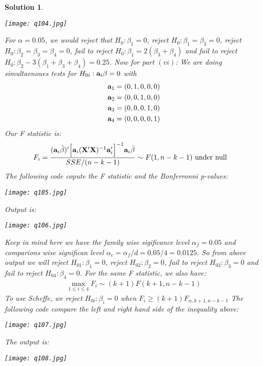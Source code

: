 \documentclass[11pt]{article}
\newtheorem{sol}{Solution}
\begin{document}
\begin{sol}
	\begin{center}
		\texttt{[image: q104.jpg]}
	\end{center}	
	For $\alpha = 0.05$, we would reject that $H_0: \beta_1 = 0$, reject $H_0: \beta_1 = \beta_3 = 0$, reject $H_0: \beta_2 = \beta_3 = \beta_4 = 0$, fail to reject $H_0: \beta_1 = 2(\beta_3 + \beta_4)$ and fail to reject $H_0: \beta_2 - 3(\beta_1 + \beta_3 + \beta_4) = 0.25$.\vskip 2mm
	Now for part $(vi)$:\vskip 2mm
	We are doing simultaenoues tests for $H_{0i}: {\bf a}_i \beta = 0$ with
	\begin{align*}
		{\bf a}_1 &= (0, 1, 0, 0, 0)\\
		{\bf a}_2 &= (0, 0, 1, 0, 0)\\
		{\bf a}_3 &= (0, 0, 0, 1, 0)\\
		{\bf a}_4 &= (0, 0, 0, 0, 1)
	\end{align*} 
	Our F statistic is:
	\begin{align*}
		F_i &= \frac{({\bf a}_i\hat{\beta})'\Big[{\bf a}_i({\bf X}'{\bf X})^{-1}{\bf a}_i'\Big]^{-1}{\bf a}_i\hat{\beta}}{SSE/(n - k - 1)} \sim F(1, n - k - 1) \text{ under null}
	\end{align*}
	The following code copute the F statistic and the Bonferronni p-values:
	\begin{center}
		\texttt{[image: q105.jpg]}
	\end{center}	
	Output is:
	\begin{center}
		\texttt{[image: q106.jpg]}
	\end{center}	
	Keep in mind here we have the family wise sigificance level $\alpha_f = 0.05$ and comparions wise significan level $\alpha_c = \alpha_f/d = 0.05/4 = 0.0125$.\vskip 2mm
	So from above output we will reject $H_{01}: \beta_1 =0$, reject $H_{02}: \beta_2 = 0$, fail to reject $H_{03}: \beta_3 = 0 $ and fail to reject $H_{04}: \beta_4 = 0$.\vskip 2mm
	For the same F statistic, we also have:
	\begin{align*}
		\max_{1 \leq i \leq 4}F_i  \sim (k + 1)F(k + 1, n - k - 1)
	\end{align*}
	To use Scheffe, we reject $H_{0i}: \beta_i = 0$ when $F_i \geq  (k + 1)F_{\alpha, k + 1, n - k - 1}$
	The following code compare the left and right hand side of the inequality above:
	\begin{center}
		\texttt{[image: q107.jpg]}
	\end{center}	
	The output is:
	\begin{center}
		\texttt{[image: q108.jpg]}

\end{center}
\end{sol}
\end{document}
